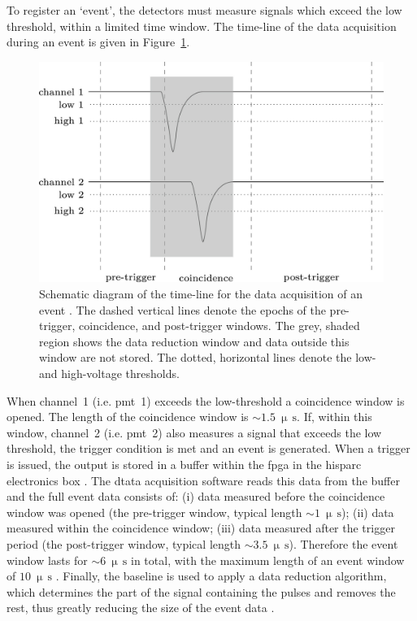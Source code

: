 To register an `event', the detectors must measure signals which exceed the low threshold, within a limited time window. The time-line of the data acquisition during an event is given in Figure~\ref{fig:HS_windows}.

\begin{figure}[ht!]
	\centering
	\includegraphics[width=0.9\columnwidth]{HS_pulses.jpg}
	\caption{Schematic diagram of the time-line for the data acquisition of an event \citep{fokkema_hisparc_2012}. The dashed vertical lines denote the epochs of the pre-trigger, coincidence, and post-trigger windows. The grey, shaded region shows the data reduction window and data outside this window are not stored. The dotted, horizontal lines denote the low- and high-voltage thresholds.}
	\label{fig:HS_windows}
\end{figure}

When channel~1 (i.e. \gls{pmt}~1) exceeds the low-threshold a coincidence window is opened. The length of the coincidence window is $\sim1.5~\upmu\,\mathrm{s}$. If, within this window, channel~2 (i.e. \gls{pmt}~2) also measures a signal that exceeds the low threshold, the trigger condition is met and an event is generated. When a trigger is issued, the output is stored in a buffer within the \gls{fpga} in the \gls{hisparc} electronics box \citep{fokkema_hisparc_2012}. The dtata acquisition software  reads this data from the buffer and the full event data consists of: (i) data measured before the coincidence window was opened (the pre-trigger window, typical length $\sim1~\upmu\,\mathrm{s}$); (ii) data measured within the coincidence window; (iii) data measured after the trigger period (the post-trigger window, typical length $\sim3.5~\upmu\,\mathrm{s}$). Therefore the event window lasts for $\sim6~\upmu\,\mathrm{s}$ in total, with the maximum length of an event window of $10~\upmu\,\mathrm{s}$ \citep{van_dam_hisparc_2020}. Finally, the baseline is used to apply a data reduction algorithm, which determines the part of the signal containing the pulses and removes the rest, thus greatly reducing the size of the event data \citep{fokkema_hisparc_2012}.

